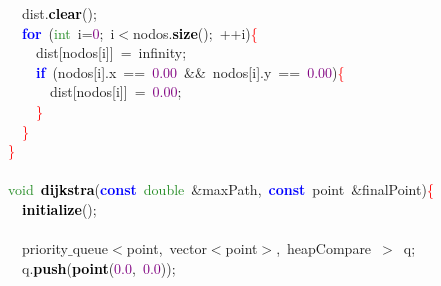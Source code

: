 \documentclass[10pt,a4paper,twoside]{article}
\begin{document}
{{{{{\mbox{}\ \ \ \ dist\textcolor{BrickRed}{.}\textbf{\textcolor{Black}{clear}}\textcolor{BrickRed}{();} \\
\mbox{}\ \ \ \ \textbf{\textcolor{Blue}{for}}\ \textcolor{BrickRed}{(}\textcolor{ForestGreen}{int}\ i\textcolor{BrickRed}{=}\textcolor{Purple}{0}\textcolor{BrickRed}{;}\ i\textcolor{BrickRed}{$<$}nodos\textcolor{BrickRed}{.}\textbf{\textcolor{Black}{size}}\textcolor{BrickRed}{();}\ \textcolor{BrickRed}{++}i\textcolor{BrickRed}{)}\textcolor{Red}{\{} \\
\mbox{}\ \ \ \ \ \ dist\textcolor{BrickRed}{[}nodos\textcolor{BrickRed}{[}i\textcolor{BrickRed}{]]}\ \textcolor{BrickRed}{=}\ infinity\textcolor{BrickRed}{;} \\
\mbox{}\ \ \ \ \ \ \textbf{\textcolor{Blue}{if}}\ \textcolor{BrickRed}{(}nodos\textcolor{BrickRed}{[}i\textcolor{BrickRed}{].}x\ \textcolor{BrickRed}{==}\ \textcolor{Purple}{0.00}\ \textcolor{BrickRed}{\&\&}\ nodos\textcolor{BrickRed}{[}i\textcolor{BrickRed}{].}y\ \textcolor{BrickRed}{==}\ \textcolor{Purple}{0.00}\textcolor{BrickRed}{)}\textcolor{Red}{\{} \\
\mbox{}\ \ \ \ \ \ \ \ dist\textcolor{BrickRed}{[}nodos\textcolor{BrickRed}{[}i\textcolor{BrickRed}{]]}\ \textcolor{BrickRed}{=}\ \textcolor{Purple}{0.00}\textcolor{BrickRed}{;} \\
\mbox{}\ \ \ \ \ \ \textcolor{Red}{\}} \\
\mbox{}\ \ \ \ \textcolor{Red}{\}} \\
\mbox{}\ \ \textcolor{Red}{\}} \\
\mbox{} \\
\mbox{}\ \ \textcolor{ForestGreen}{void}\ \textbf{\textcolor{Black}{dijkstra}}\textcolor{BrickRed}{(}\textbf{\textcolor{Blue}{const}}\ \textcolor{ForestGreen}{double}\ \textcolor{BrickRed}{\&}maxPath\textcolor{BrickRed}{,}\ \textbf{\textcolor{Blue}{const}}\ point\ \textcolor{BrickRed}{\&}finalPoint\textcolor{BrickRed}{)}\textcolor{Red}{\{} \\
\mbox{}\ \ \ \ \textbf{\textcolor{Black}{initialize}}\textcolor{BrickRed}{();} \\
\mbox{}\ \ \ \  \\
\mbox{}\ \ \ \ priority$\_$queue\textcolor{BrickRed}{$<$}point\textcolor{BrickRed}{,}\ vector\textcolor{BrickRed}{$<$}point\textcolor{BrickRed}{$>$,}\ heapCompare\ \textcolor{BrickRed}{$>$}\ q\textcolor{BrickRed}{;} \\
\mbox{}\ \ \ \ q\textcolor{BrickRed}{.}\textbf{\textcolor{Black}{push}}\textcolor{BrickRed}{(}\textbf{\textcolor{Black}{point}}\textcolor{BrickRed}{(}\textcolor{Purple}{0.0}\textcolor{BrickRed}{,}\ \textcolor{Purple}{0.0}\textcolor{BrickRed}{));} \\
}}}}}
\end{document}
